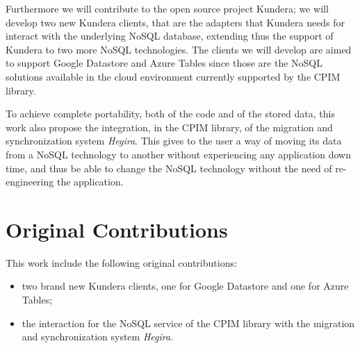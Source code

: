 \noindent Furthermore we will contribute to the open source project Kundera; we will develop two new Kundera clients, that are the adapters that Kundera needs for interact with the underlying NoSQL database, extending thus the support of Kundera to two more NoSQL technologies. The clients we will develop are aimed to support Google Datastore and Azure Tables since those are the NoSQL solutions available in the cloud environment currently supported by the CPIM library.

\noindent To achieve complete portability, both of the code and of the stored data, this work also propose the integration, in the CPIM library, of the migration and synchronization system \textit{Hegira}. This gives to the user a way of moving its data from a NoSQL technology to another without experiencing any application down time, and thus be able to change the NoSQL technology without the need of re-engineering the application.
 
\section*{Original Contributions}
This work include the following original contributions:
\begin{itemize}
\item two brand new Kundera clients, one for Google Datastore and one for Azure Tables;
\item the interaction for the NoSQL service of the CPIM library with the migration and synchronization system \textit{Hegira}.
\end{itemize}

